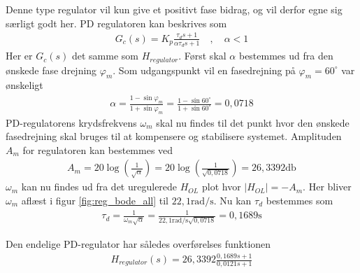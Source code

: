 Denne type regulator vil kun give et positivt fase bidrag, og vil derfor egne sig særligt godt her.
PD regulatoren kan beskrives som \cite[s.276, (6.7)]{Reg2015}
\begin{align}
G_c(s) = K_p \frac{\tau_d s + 1}{\alpha \tau_d s + 1} \quad, \quad \alpha < 1  \label{eq:reg_gc}
\end{align}	
Her er $G_c(s)$ det samme som $H_{regulator}$. 
Først skal $\alpha$ bestemmes ud fra den ønskede fase drejning $\varphi_m$. Som udgangspunkt vil en fasedrejning på $\varphi_m = 60^{\circ}$ var ønskeligt \cite[s. 278]{Reg2015}
\begin{align}
\alpha = \frac{1 - \sin{\varphi_m}}{1 + \sin{\varphi_m}} = \frac{1 - \sin{60^{\circ}}}{1 + \sin{60^{\circ}}} = 0,0718
\end{align}
PD-regulatorens krydsfrekvens $\omega_m$ skal nu findes til det punkt hvor den ønskede fasedrejning skal bruges til at kompensere og stabilisere systemet.
Amplituden $A_m$ for regulatoren kan bestemmes ved \cite[s. 277, fig. 6.21]{Reg2015}
\begin{align}
A_m = 20 \log \left(\frac{1}{\sqrt{\alpha}}\right) =  20 \log \left(\frac{1}{\sqrt{0,0718}}\right) = 26,3392 \si{\decibel}
\end{align}
$\omega_m$ kan nu findes ud fra det uregulerede $H_{OL}$ plot hvor $|H_{OL}| = -A_m$.
Her bliver $\omega_m$ aflæst i figur \ref{fig:reg_bode_all} til $22,1 \si{\radian\per\second}$. 
Nu kan $\tau_d$ bestemmes som \cite[s. 279, (6.13)]{Reg2015}
\begin{align}
\tau_d = \frac{1}{\omega_m\sqrt{\alpha}} = \frac{1}{22,1 \si{\radian\per\second}\sqrt{0,0718}} = 0,1689 \si{\second}
\end{align}

Den endelige PD-regulator har således overførelses funktionen
\begin{align}
H_{regulator}(s) = 26,3392 \frac{0,1689 s + 1}{0,0121 s + 1}  \label{eq:reg_pd_final}
\end{align}	


